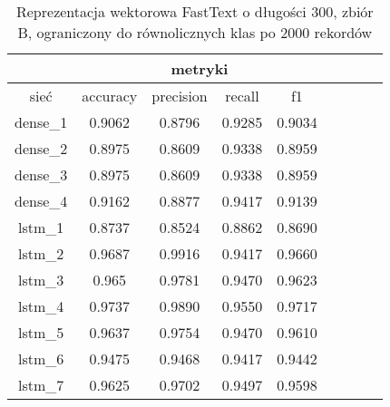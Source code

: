 \begin{table}[p]  \centering
    \caption{Reprezentacja wektorowa FastText o długości 300, zbiór B, ograniczony do \label{tab:wyniki_fasttext_B_lim}
        równolicznych klas po 2000 rekordów}
        \label{tab:wyniki_300_eks3}
        \begin{tabular} {|c|c|c|c|c|c|c|c|c| }    \hline
                 & \multicolumn{4}{c|}{metryki}                                                                                        \\ \hline
        sieć     & accuracy                     & precision                  & recall                     & f1                         \\ \hline
        dense\_1 & 0.9062                       & 0.8796                     & 0.9285                     & 0.9034                     \\ \hline
        dense\_2 & 0.8975                       & 0.8609                     & 0.9338                     & 0.8959                     \\ \hline
        dense\_3 & 0.8975                       & 0.8609                     & 0.9338                     & 0.8959                     \\ \hline
        dense\_4 & 0.9162                       & 0.8877                     & 0.9417                     & 0.9139                     \\ \hline
        lstm\_1  & 0.8737                       & 0.8524                     & 0.8862                     & 0.8690                     \\ \hline
        lstm\_2  & 0.9687                       & 0.9916                     & 0.9417                     & 0.9660                     \\ \hline
        lstm\_3  & 0.965                        & 0.9781                     & 0.9470                     & 0.9623                     \\ \hline
        lstm\_4  & 0.9737                       & 0.9890                     & 0.9550                     & 0.9717                     \\ \hline
        lstm\_5  & 0.9637                       & 0.9754                     & 0.9470                     & 0.9610                     \\ \hline
        lstm\_6  & 0.9475                       & 0.9468                     & 0.9417                     & 0.9442                     \\ \hline
        lstm\_7  & 0.9625                       & 0.9702                     & 0.9497                     & 0.9598                     \\ \hline

\end{tabular}
\end{table}
